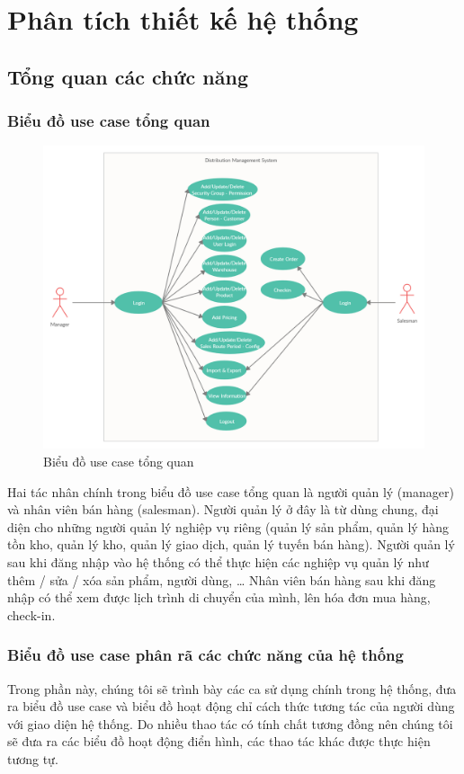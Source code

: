 \chapter{Phân tích thiết kế hệ thống}
\section{Tổng quan các chức năng}
\subsection{Biểu đồ use case tổng quan}
\begin{figure}[H]
    \centering
    \includegraphics[width=12cm]{images/use-case/use-case-summary.jpg}
    \caption{Biểu đồ use case tổng quan}
\end{figure}

Hai tác nhân chính trong biểu đồ use case tổng quan
là người quản lý (manager) và nhân viên bán hàng (salesman).
Người quản lý ở đây là từ dùng chung, đại diện cho những người
quản lý nghiệp vụ riêng (quản lý sản phẩm, quản lý hàng tồn kho,
quản lý kho, quản lý giao dịch, quản lý tuyến bán hàng).
Người quản lý sau khi đăng nhập vào hệ thống có thể thực hiện
các nghiệp vụ quản lý như thêm / sửa / xóa sản phẩm, người dùng, …
Nhân viên bán hàng sau khi đăng nhập có thể xem được lịch
trình di chuyển của mình, lên hóa đơn mua hàng, check-in.

\subsection{Biểu đồ use case phân rã các chức năng của hệ thống}
Trong phần này, chúng tôi sẽ trình bày các ca sử dụng chính trong hệ
thống, đưa ra biểu đồ use case và biểu đồ hoạt động chỉ cách
thức tương tác của người dùng với giao diện hệ thống. Do nhiều thao
tác có tính chất tương đồng nên chúng tôi sẽ đưa ra các biểu
đồ hoạt động điển hình, các thao tác khác được thực hiện tương tự.

